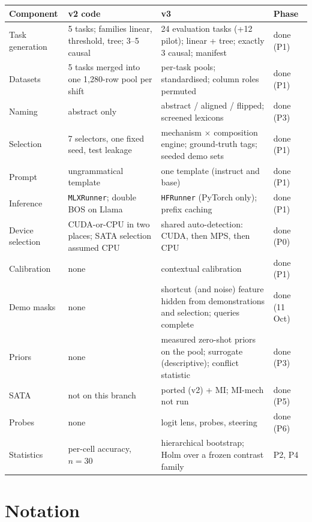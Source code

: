 \documentclass[11pt,a4paper]{article}
\newcommand{\1}{\mathbf{1}}
\theoremstyle{plain}
\theoremstyle{definition}
\theoremstyle{remark}
\begin{document}
\begin{center}
\begin{tabular}{L{3.0cm}L{5.4cm}L{5.4cm}L{1.2cm}}
\toprule
\textbf{Component} & \textbf{v2 code} & \textbf{v3} & \textbf{Phase} \\
\midrule
Task generation & 5 tasks; families linear, threshold, tree; 3--5 causal &
24 evaluation tasks (+12 pilot); linear + tree; exactly 3 causal; manifest & done (P1) \\
Datasets & 5 tasks merged into one 1{,}280-row pool per shift & per-task
pools; standardised; column roles permuted & done (P1) \\
Naming & abstract only & abstract / aligned / flipped; screened lexicons & done (P3) \\
Selection & 7 selectors, one fixed seed, test leakage & mechanism $\times$
composition engine; ground-truth tags; seeded demo sets & done (P1) \\
Prompt & ungrammatical template & one template (instruct and base) & done (P1) \\
Inference & \texttt{MLXRunner}; double BOS on Llama & \texttt{HFRunner}
(PyTorch only); prefix caching & done (P1) \\
Device selection & CUDA-or-CPU in two places; SATA selection assumed CPU &
shared auto-detection: CUDA, then MPS, then CPU & done (P0) \\
Calibration & none & contextual calibration & done (P1) \\
Demo masks & none & shortcut (and noise) feature hidden from demonstrations and selection; queries complete & done (11 Oct) \\
Priors & none & measured zero-shot priors on the pool; surrogate (descriptive); conflict statistic & done (P3) \\
SATA & not on this branch & ported (v2) + MI; MI-mech not run & done (P5) \\
Probes & none & logit lens, probes, steering & done (P6) \\
Statistics & per-cell accuracy, $n=30$ & hierarchical bootstrap; Holm over a frozen contrast family & P2, P4 \\
\bottomrule
\end{tabular}
\end{center}

\section{Notation}
\end{document}
